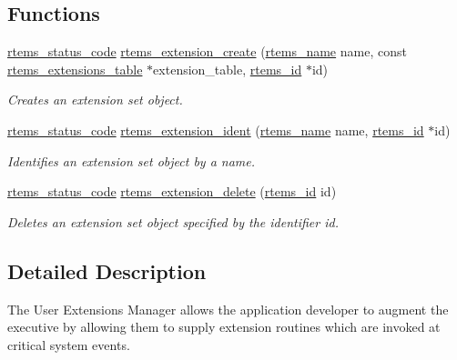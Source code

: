 \subsection*{Functions}
\begin{DoxyCompactItemize}
\item 
\mbox{\hyperlink{group__ClassicStatus_ga545d41846817eaba6143d52ee4d9e9fe}{rtems\+\_\+status\+\_\+code}} \mbox{\hyperlink{group__ClassicUserExtensions_gafcf5ccf8b70f2967ffbf8b493e278fbf}{rtems\+\_\+extension\+\_\+create}} (\mbox{\hyperlink{group__ClassicTasks_ga55fb63c49f68c0cbd9bee004da15b1fd}{rtems\+\_\+name}} name, const \mbox{\hyperlink{structUser__extensions__Table}{rtems\+\_\+extensions\+\_\+table}} $\ast$extension\+\_\+table, \mbox{\hyperlink{group__ClassicTasks_gab20892b814dced7dd4e5b9bf42becd57}{rtems\+\_\+id}} $\ast$id)
\begin{DoxyCompactList}\small\item\em Creates an extension set object. \end{DoxyCompactList}\item 
\mbox{\hyperlink{group__ClassicStatus_ga545d41846817eaba6143d52ee4d9e9fe}{rtems\+\_\+status\+\_\+code}} \mbox{\hyperlink{group__ClassicUserExtensions_ga0286a5c091767c95c1eb1c80abca42d6}{rtems\+\_\+extension\+\_\+ident}} (\mbox{\hyperlink{group__ClassicTasks_ga55fb63c49f68c0cbd9bee004da15b1fd}{rtems\+\_\+name}} name, \mbox{\hyperlink{group__ClassicTasks_gab20892b814dced7dd4e5b9bf42becd57}{rtems\+\_\+id}} $\ast$id)
\begin{DoxyCompactList}\small\item\em Identifies an extension set object by a name. \end{DoxyCompactList}\item 
\mbox{\hyperlink{group__ClassicStatus_ga545d41846817eaba6143d52ee4d9e9fe}{rtems\+\_\+status\+\_\+code}} \mbox{\hyperlink{group__ClassicUserExtensions_ga0176b754e31634c92a0f206c0d7f2730}{rtems\+\_\+extension\+\_\+delete}} (\mbox{\hyperlink{group__ClassicTasks_gab20892b814dced7dd4e5b9bf42becd57}{rtems\+\_\+id}} id)
\begin{DoxyCompactList}\small\item\em Deletes an extension set object specified by the identifier {\itshape id}. \end{DoxyCompactList}\end{DoxyCompactItemize}


\subsection{Detailed Description}
The User Extensions Manager allows the application developer to augment the executive by allowing them to supply extension routines which are invoked at critical system events. 

